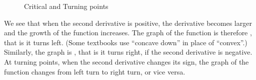 \begin{figure}
\begin{center}
\end{center}
\caption{Critical and Turning points}
\label{figkurvdiss3}
\end{figure}
We see that when the second derivative is positive, the derivative becomes
larger and the growth of the function increases. The graph of the function
is therefore , that is it turns left.
(Some textbooks use ``concave down'' in place of ``convex''.) Similarly, the
graph is , that is it turns right, if the second derivative
is negative.
At turning points, when the second derivative changes its sign, the graph of
the function changes from left turn to right turn, or vice versa.
\medskip


